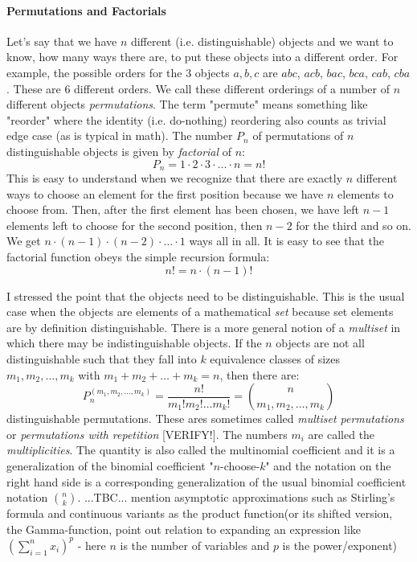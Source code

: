 \paragraph{Permutations and Factorials}
Let's say that we have $n$ different (i.e. distinguishable) objects and we want to know, how many ways there are, to put these objects into a different order. For example, the possible orders for the $3$ objects $a,b,c$ are $abc$, $acb$, $bac$, $bca$, $cab$, $cba$. These are $6$ different orders. We call these different orderings of a number of $n$ different objects \emph{permutations}. The term "permute" means something like "reorder" where the identity (i.e. do-nothing) reordering also counts as trivial edge case (as is typical in math). The number $P_n$ of permutations of $n$ distinguishable objects is given by \emph{factorial} of $n$:
\begin{equation}
P_n = 1 \cdot 2 \cdot 3 \cdot \ldots \cdot n = n!
\end{equation}
This is easy to understand when we recognize that there are exactly $n$ different ways to choose an element for the first position because we have $n$ elements to choose from. Then, after the first element has been chosen, we have left $n-1$ elements left to choose for the second position, then $n-2$ for the third and so on. We get $n\cdot(n-1)\cdot(n-2)\cdot\ldots\cdot1$ ways all in all. It is easy to see that the factorial function obeys the simple recursion formula:
\begin{equation}
n! = n \cdot (n-1)!
\end{equation}

\medskip
I stressed the point that the objects need to be distinguishable. This is the usual case when the objects are elements of a mathematical \emph{set} because set elements are by definition distinguishable. There is a more general notion of a \emph{multiset} in which there may be indistinguishable objects. If the $n$ objects are not all distinguishable such that they fall into $k$ equivalence classes of sizes $m_1, m_2, \ldots, m_k$ with $m_1 + m_2 + \ldots + m_k = n$, then there are:
\begin{equation}
P_n^{(m_1,m_2,\ldots,m_k)} 
= \frac{n!}{m_1! m_2! \ldots m_k!} 
= \binom{n}{m_1,m_2,\ldots, m_k}
\end{equation}
distinguishable permutations. These ares sometimes called \emph{multiset permutations} or \emph{permutations with repetition} [VERIFY!]. The numbers $m_i$ are called the \emph{multiplicities}. The quantity is also called the multinomial coefficient and it is a generalization of the binomial coefficient "$n$-choose-$k$" and the notation on the right hand side is a corresponding generalization of the usual binomial coefficient notation $\binom{n}{k}$. ...TBC... mention asymptotic approximations such as Stirling's formula and continuous variants as the product function(or its shifted version, the Gamma-function, point out relation to expanding an expression like $(\sum_{i=1}^{n} x_i)^p$ - here $n$ is the number of variables and $p$ is the power/exponent)

